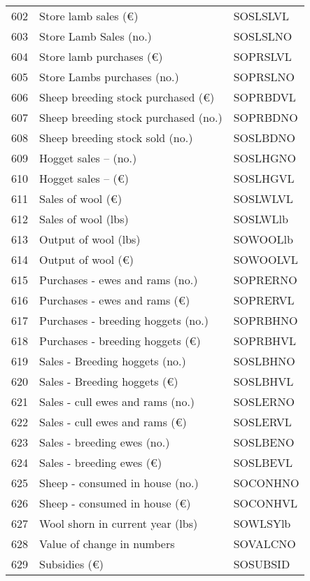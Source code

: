 \documentclass{article}\usepackage{graphicx, color}
\begin{document}
\begin{flushleft}
\begin{table}[ht]
\begin{center}
\begin{tabular}{rll}
  602 & Store lamb sales         (€) & SOSLSLVL \\ 
  603 & Store Lamb Sales         (no.) & SOSLSLNO \\ 
  604 & Store lamb purchases     (€) & SOPRSLVL \\ 
  605 & Store Lambs purchases    (no.) & SOPRSLNO \\ 
  606 & Sheep breeding stock purchased (€) & SOPRBDVL \\ 
  607 & Sheep breeding stock purchased (no.) & SOPRBDNO \\ 
  608 & Sheep breeding stock sold      (no.) & SOSLBDNO \\ 
  609 & Hogget sales --    (no.) & SOSLHGNO \\ 
  610 & Hogget sales --     (€) & SOSLHGVL \\ 
  611 & Sales of wool             (€) & SOSLWLVL \\ 
  612 & Sales of wool             (lbs) & SOSLWLlb \\ 
  613 & Output of wool            (lbs) & SOWOOLlb \\ 
  614 & Output of wool            (€) & SOWOOLVL \\ 
  615 & Purchases - ewes and rams     (no.) & SOPRERNO \\ 
  616 & Purchases - ewes and rams     (€) & SOPRERVL \\ 
  617 & Purchases - breeding hoggets  (no.) & SOPRBHNO \\ 
  618 & Purchases - breeding hoggets  (€) & SOPRBHVL \\ 
  619 & Sales - Breeding hoggets      (no.) & SOSLBHNO \\ 
  620 & Sales - Breeding hoggets      (€) & SOSLBHVL \\ 
  621 & Sales - cull ewes and rams    (no.) & SOSLERNO \\ 
  622 & Sales - cull ewes and rams    (€) & SOSLERVL \\ 
  623 & Sales - breeding ewes         (no.) & SOSLBENO \\ 
  624 & Sales - breeding ewes         (€) & SOSLBEVL \\ 
  625 & Sheep - consumed in house     (no.) & SOCONHNO \\ 
  626 & Sheep - consumed in house     (€) & SOCONHVL \\ 
  627 & Wool shorn in current year    (lbs) & SOWLSYlb \\ 
  628 & Value of change in numbers & SOVALCNO \\ 
  629 & Subsidies                      (€) & SOSUBSID \\ 

\end{tabular}
\end{center}
\end{table}
\end{flushleft}
\end{document}
